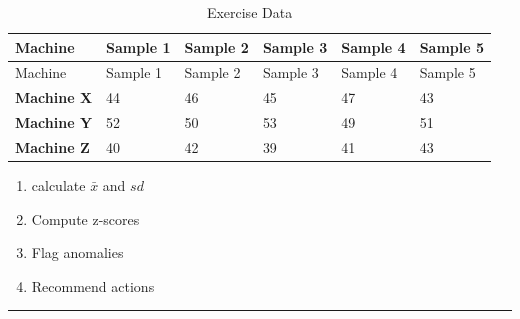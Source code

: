 \documentclass[
  a4paper,
]{scrbook}
\providecommand{\tightlist}{%
  \setlength{\itemsep}{0pt}\setlength{\parskip}{0pt}}\usepackage{longtable,booktabs,array}
\begin{document}
\begin{longtable}[]{@{}llllll@{}}
\caption{Exercise Data}\tabularnewline
\toprule\noalign{}
Machine & Sample 1 & Sample 2 & Sample 3 & Sample 4 & Sample 5 \\
\midrule\noalign{}
\endfirsthead
\toprule\noalign{}
Machine & Sample 1 & Sample 2 & Sample 3 & Sample 4 & Sample 5 \\
\midrule\noalign{}
\endhead
\bottomrule\noalign{}
\endlastfoot
\textbf{Machine X} & 44 & 46 & 45 & 47 & 43 \\
\textbf{Machine Y} & 52 & 50 & 53 & 49 & 51 \\
\textbf{Machine Z} & 40 & 42 & 39 & 41 & 43 \\
\end{longtable}

\begin{table}

\caption{\label{tbl-exercise-z}Exercise Data}


\end{table}%

\begin{enumerate}
\def\labelenumi{\arabic{enumi}.}
\tightlist
\item
  calculate \(\bar{x}\) and \(sd\)
\item
  Compute z-scores
\item
  Flag anomalies
\item
  Recommend actions
\end{enumerate}

\begin{center}\rule{0.5\linewidth}{0.5pt}\end{center}
\end{document}
